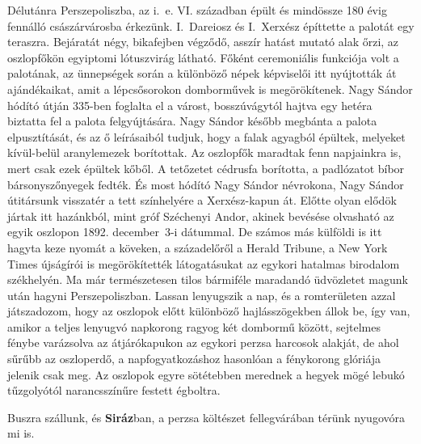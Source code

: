
Délutánra Perszepoliszba, az i.~e. VI. században épült és mindössze
180 évig fennálló császárvárosba érkezünk. I.~Dareiosz és I.~Xerxész
építtette a palotát egy teraszra. Bejáratát négy, bikafejben végződő,
asszír hatást mutató alak őrzi, az oszlopfőkön egyiptomi lótuszvirág
látható. Főként ceremoniális funkciója volt a palotának, az ünnepségek
során a különböző népek képviselői itt nyújtották át ajándékaikat,
amit a lépcsősorokon domborművek is megörökítenek. Nagy Sándor
hódító útján 335-ben foglalta el a várost, bosszúvágytól hajtva egy
hetéra biztatta fel a palota felgyújtására. Nagy Sándor később megbánta
a palota elpusztítását, és az ő leírásaiból tudjuk, hogy a falak agyagból
épültek, melyeket kívül-belül aranylemezek borítottak. Az oszlopfők
maradtak fenn napjainkra is, mert csak ezek épültek kőből. A tetőzetet
cédrusfa borította, a padlózatot bíbor bársonyszőnyegek fedték. És
most hódító Nagy Sándor névrokona, Nagy Sándor útitársunk visszatér
a tett színhelyére a Xerxész-kapun át. Előtte olyan elődök jártak itt
hazánkból, mint gróf Széchenyi Andor, akinek bevésése olvasható az
egyik oszlopon 1892. december~3-i dátummal. De számos más külföldi
is itt hagyta keze nyomát a köveken, a századelőről a Herald Tribune,
a New York Times újságírói is megörökítették látogatásukat az egykori
hatalmas birodalom székhelyén. Ma már természetesen tilos bármiféle
maradandó üdvözletet magunk után hagyni Perszepoliszban. Lassan
lenyugszik a nap, és a romterületen azzal játszadozom, hogy az oszlopok
előtt különböző hajlásszögekben állok be, így van, amikor a teljes
lenyugvó napkorong ragyog két dombormű között, sejtelmes fénybe
varázsolva az átjárókapukon az egykori perzsa harcosok alakját, de ahol
sűrűbb az oszloperdő, a napfogyatkozáshoz hasonlóan a fénykorong
glóriája jelenik csak meg. Az oszlopok egyre sötétebben merednek a
hegyek mögé lebukó tűzgolyótól narancsszínűre festett égboltra.



Buszra szállunk, és \textbf{Siráz}ban, a perzsa költészet fellegvárában
térünk nyugovóra mi is.

